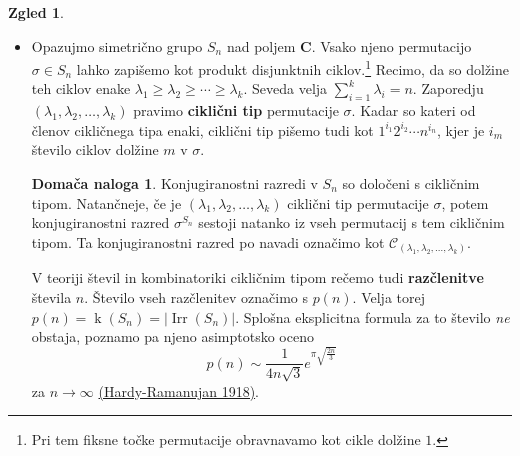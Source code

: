 \documentclass[11pt]{book}
\def\CC{\mathbf{C}}
\def\conclass{\mathcal{C}}
\DeclareMathOperator\Irr{Irr}
\DeclareMathOperator\kk{k}
\def\definicija{\color{rdeca}\bf}
\theoremstyle{definition}
\theoremstyle{zgled}
\newtheorem{zgled}[theorem]{Zgled}
\theoremstyle{zgledbrezstevilke}
\theoremstyle{odprtproblem}
\theoremstyle{domacanaloga}
\newtheorem{domacanaloga}[theorem]{Domača naloga}
\theoremstyle{izrek}
\begin{document}
\begin{zgled}
\begin{itemize}
Skupaj smo torej našli ravno $\kk(D_{2n})$ nerazcepnih upodobitev, zato so to \emph{vse} nerazcepne upodobitve grupe $D_{2n}$.

\begin{table}[t]
    \centering
\begin{tabular}{c|ccc}
    & $1$ & $r^i$ & $s$ \\ \hline
    $\chi_{\epsilon}$ & $1$ & $1$ & $\epsilon$ \\
    $\chi_{\rho_k}$ & $2$ & $2 \cos(2 \pi i k / n)$ & $0$ \\
\end{tabular}
\caption{Tabela karakterjev $D_{2n}$ za lih $n$}
\end{table}

\begin{domacanaloga}
Izračunaj tabelo kompleksnih karakterjev kvaternionske grupe $Q_8 = \{ \pm 1, \pm i, \pm j, \pm k \}$, v kateri velja $i^2 = j^2 = k^2 = ijk = -1$. Primerjaj jo s tabelo karakterjev grupe $D_8$.
\end{domacanaloga}

\item Opazujmo simetrično grupo $S_n$ nad poljem $\CC$. Vsako njeno permutacijo $\sigma \in S_n$ lahko zapišemo kot produkt disjunktnih ciklov.\footnote{Pri tem fiksne točke permutacije obravnavamo kot cikle dolžine $1$.} Recimo, da so dolžine teh ciklov enake $\lambda_1 \geq \lambda_2 \geq \cdots \geq \lambda_{k}$. Seveda velja $\sum_{i = 1}^{k} \lambda_i = n$. Zaporedju $(\lambda_1, \lambda_2, \dots, \lambda_{k})$ pravimo {\definicija ciklični tip} permutacije $\sigma$. Kadar so kateri od členov cikličnega tipa enaki, ciklični tip pišemo tudi kot $1^{i_1} 2^{i_2} \cdots n^{i_n}$, kjer je $i_m$ število ciklov dolžine $m$ v $\sigma$.

\begin{domacanaloga}
Konjugiranostni razredi v $S_n$ so določeni s cikličnim tipom. Natančneje, če je $(\lambda_1, \lambda_2, \dots, \lambda_{k})$ ciklični tip permutacije $\sigma$, potem konjugiranostni razred $\sigma^{S_n}$ sestoji natanko iz vseh permutacij s tem cikličnim tipom. Ta konjugiranostni razred po navadi označimo kot $\conclass_{(\lambda_1, \lambda_2, \dots, \lambda_k)}$.
\end{domacanaloga}

V teoriji števil in kombinatoriki cikličnim tipom rečemo tudi {\definicija razčlenitve} števila $n$. Število vseh razčlenitev označimo s $p(n)$. Velja torej $p(n) = \kk(S_n) = |\Irr(S_n)|$. Splošna eksplicitna formula za to število \emph{ne} obstaja, poznamo pa njeno asimptotsko oceno
\[
    p(n) \sim \frac{1}{4 n \sqrt{3}} e^{\pi \sqrt{\frac{2n}{3}}}
\]
za $n \to \infty$ \href{https://academic.oup.com/plms/article-abstract/s2-17/1/75/1536632?redirectedFrom=PDF}{(Hardy-Ramanujan 1918)}. 


\end{itemize}
\end{zgled}
\end{document}
